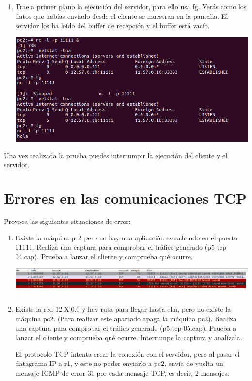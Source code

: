 \documentclass[12pt, a4paper]{report}
\begin{document}
\begin{enumerate}
	\item Trae a primer plano la ejecución del servidor, para ello usa fg. Verás como los datos que habías enviado desde el cliente se muestran en la pantalla. El servidor los ha leído del buffer de recepción y el buffer está vacío.
	
	\includegraphics*[width=128mm, scale=0.5, center]{ejercicio1}
	
\end{enumerate}

Una vez realizada la prueba puedes interrumpir la ejecución del cliente y el servidor.

\section{Errores en las comunicaciones TCP}
Provoca las siguientes situaciones de error:

\begin{enumerate}
	\item Existe la máquina pc2 pero no hay una aplicación escuchando en el puerto 11111. Realiza una captura para comprobar el tráfico generado (p5-tcp-04.cap). Prueba a lanzar el cliente y comprueba qué ocurre.
	
	\includegraphics*[width=128mm, scale=0.5, center]{ejercicio2}
	
	\item Existe la red 12.X.0.0 y hay ruta para llegar hasta ella, pero no existe la máquina pc2. (Para realizar este apartado apaga la máquina pc2). Realiza una captura para comprobar el tráfico generado (p5-tcp-05.cap). Prueba a lanzar el cliente y comprueba qué ocurre. Interrumpe la captura y analízala.
	
	El protocolo TCP intenta crear la conexión con el servidor, pero al pasar el datagrama IP a r1, y este no poder enviarlo a pc2, envía de vuelta un mensaje ICMP de error 31 por cada mensaje TCP, es decir, 2 mensajes.
	
\end{enumerate}
\end{document}
